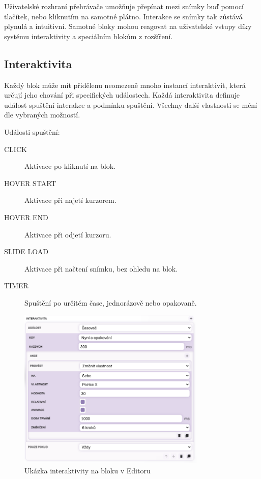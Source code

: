Uživatelské rozhraní přehrávače umožňuje přepínat mezi snímky buď pomocí tlačítek, nebo kliknutím na samotné plátno.
Interakce se snímky tak zůstává plynulá a intuitivní. 
Samotné bloky mohou reagovat na uživatelské vstupy díky systému interaktivity a speciálním blokům z rozšíření.

\subsection{Interaktivita}

Každý blok může mít přidělenu neomezeně mnoho instancí interaktivit, která určují jeho chování při specifických událostech. 
Každá interaktivita definuje událost spuštění interakce a podmínku spuštění.
Všechny další vlastnosti se mění dle vybraných možností.

Události spuštění:
\begin{description}
  \item[CLICK] Aktivace po kliknutí na blok.
  \item[HOVER START] Aktivace při najetí kurzorem.
  \item[HOVER END] Aktivace při odjetí kurzoru.
  \item[SLIDE LOAD] Aktivace při načtení snímku, bez ohledu na blok.
  \item[TIMER] Spuštění po určitém čase, jednorázově nebo opakovaně.
\end{description}


\begin{figure}[ht!]
    \centering
    \includegraphics[width=0.8\textwidth]{media/05_realizace/interaktivita.png}
    \caption{Ukázka interaktivity na bloku v Editoru}
    \label{fig:interaktivita}
\end{figure}


